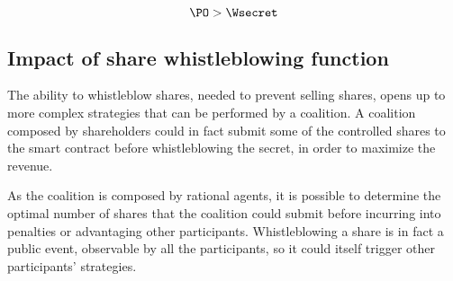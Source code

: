 \begin{equation}\label{eqbalance3}
\PO > \Wsecret
\end{equation}





\subsection{Impact of share whistleblowing function}\label{sect:impact_wh}

The ability to whistleblow shares, needed to prevent selling shares, opens up to more complex strategies that can be performed by a coalition.
A coalition \coalition composed by \K shareholders could in fact submit some of the controlled shares to the smart contract before whistleblowing the secret, in order to maximize the revenue.

As the coalition is composed by rational agents, it is possible to determine the optimal number \jopt of shares that the coalition could submit before incurring into penalties or advantaging other participants.
Whistleblowing a share is in fact a public event, observable by all the participants, so it could itself trigger other participants' strategies.

